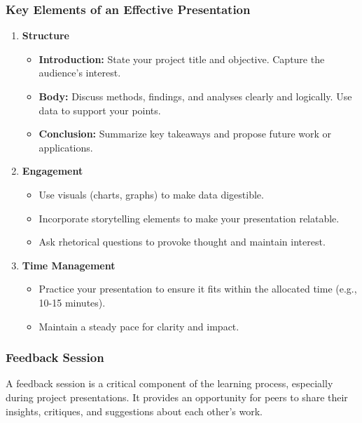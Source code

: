 \documentclass[aspectratio=169]{beamer}
\begin{document}
\begin{frame}[fragile]
    \frametitle{Key Elements of an Effective Presentation}
    \begin{enumerate}
        \item \textbf{Structure}
            \begin{itemize}
                \item \textbf{Introduction:} State your project title and objective. Capture the audience's interest.
                \item \textbf{Body:} Discuss methods, findings, and analyses clearly and logically. Use data to support your points.
                \item \textbf{Conclusion:} Summarize key takeaways and propose future work or applications.
            \end{itemize}
        \item \textbf{Engagement}
            \begin{itemize}
                \item Use visuals (charts, graphs) to make data digestible.
                \item Incorporate storytelling elements to make your presentation relatable.
                \item Ask rhetorical questions to provoke thought and maintain interest.
            \end{itemize}
        \item \textbf{Time Management}
            \begin{itemize}
                \item Practice your presentation to ensure it fits within the allocated time (e.g., 10-15 minutes).
                \item Maintain a steady pace for clarity and impact.
            \end{itemize}
    \end{enumerate}
\end{frame}

\begin{frame}[fragile]
    \frametitle{Feedback Session}
    A feedback session is a critical component of the learning process, especially during project presentations. 
    It provides an opportunity for peers to share their insights, critiques, and suggestions about each other's work.
\end{frame}
\end{document}
